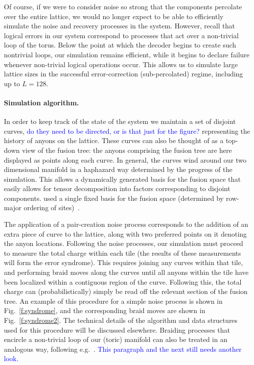 \documentclass[aps, prl, letterpaper, twocolumn, superscriptaddress, notitlepage, 10pt]{revtex4-1}
\newcommand{\Fref}[1]{Fig.~\ref{#1}}
\newcommand{\cggb}[1]{\textcolor{blue}{#1}}
\begin{document}
Of course, if we were to consider noise so strong that 
the components percolate over the entire lattice, we would no 
longer expect to be able to efficiently simulate the noise and recovery processes in the system. 
However, recall that logical errors in our system correspond to processes that act over a non-trivial loop of the torus. 
Below the point at which the decoder begins to create such nontrivial loops, our simulation remains efficient,
while it begins to declare failure whenever non-trivial logical 
operations occur. This allows us to simulate large lattice sizes 
in the successful error-correction (sub-percolated) regime, including up to $L=128$.

\paragraph{Simulation algorithm.}


In order to keep track of the state of the system 
we maintain a set of disjoint curves, \cggb{do they need to be directed, or is that just for the figure?} representing the history of anyons on the lattice.
These curves can also be thought of as a top-down view of the fusion tree:
the anyons comprising the fusion tree are here displayed as points along each curve. 
In general, the curves wind around our two 
dimensional manifold in a haphazard way determined by the progress of the simulation.
This allows a dynamically generated basis for the fusion space that easily allows for tensor 
decomposition into factors corresponding 
to disjoint components. 
used a single fixed basis for the fusion space (determined by row-major ordering of 
sites)~\cite{Brell2013}.

The application of a pair-creation noise process corresponds to the addition of an extra piece of curve to the lattice, along with two preferred points on it denoting the anyon locations. Following the noise processes, our simulation must proceed to measure the total charge within each tile (the results of these measurements will form the error syndrome). This requires joining any curves within that tile, and performing braid moves along the curves until all anyons within the tile have been localized within a contiguous region of the curve. Following this, the total charge can (probabilistically) simply be read off the relevant section of the fusion tree.
An example of this procedure for a simple noise process is shown in \Fref{f:syndrome}, and the corresponding braid moves are shown in \Fref{f:syndrome2}. The technical details of the algorithm and data structures used
for this procedure will be discussed elsewhere.
Braiding processes that encircle a non-trivial loop of our (toric) manifold can also be treated in an analogous way, following e.g.~\cite{Pfeifer2012}.
\cggb{This paragraph and the next still needs another look.}
\end{document}
